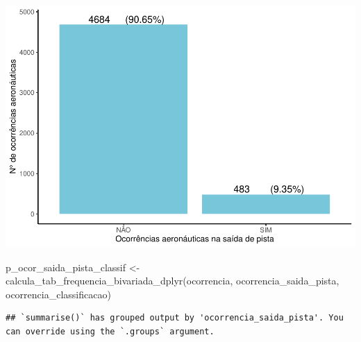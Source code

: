 \documentclass[
]{article}
\newenvironment{Shaded}{\begin{snugshade}}{\end{snugshade}}
\newcommand{\AttributeTok}[1]{\textcolor[rgb]{0.77,0.63,0.00}{#1}}
\newcommand{\ControlFlowTok}[1]{\textcolor[rgb]{0.13,0.29,0.53}{\textbf{#1}}}
\newcommand{\DecValTok}[1]{\textcolor[rgb]{0.00,0.00,0.81}{#1}}
\newcommand{\FunctionTok}[1]{\textcolor[rgb]{0.00,0.00,0.00}{#1}}
\newcommand{\NormalTok}[1]{#1}
\newcommand{\OtherTok}[1]{\textcolor[rgb]{0.56,0.35,0.01}{#1}}
\newcommand{\SpecialCharTok}[1]{\textcolor[rgb]{0.00,0.00,0.00}{#1}}
\newcommand{\StringTok}[1]{\textcolor[rgb]{0.31,0.60,0.02}{#1}}
\begin{document}
\begin{center}\includegraphics{4.Relatorio/pdf/index_files/figure-latex/unnamed-chunk-35-1} \end{center}

\begin{Shaded}
\begin{Highlighting}[]
\NormalTok{p\_ocor\_saida\_pista\_classif }\OtherTok{\textless{}{-}} \FunctionTok{calcula\_tab\_frequencia\_bivariada\_dplyr}\NormalTok{(ocorrencia,}
                                                             \StringTok{\textasciigrave{}}\AttributeTok{ocorrencia\_saida\_pista}\StringTok{\textasciigrave{}}\NormalTok{,}
                                                             \StringTok{\textasciigrave{}}\AttributeTok{ocorrencia\_classificacao}\StringTok{\textasciigrave{}}\NormalTok{)}
\end{Highlighting}
\end{Shaded}

\begin{verbatim}
## `summarise()` has grouped output by 'ocorrencia_saida_pista'. You can override using the `.groups` argument.
\end{verbatim}

\begin{Shaded}
\end{Shaded}
\end{document}
